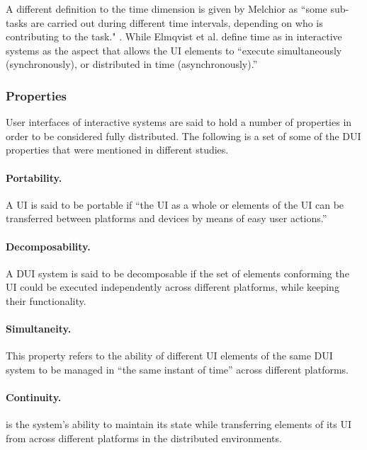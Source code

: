 A different definition to the time dimension is given by Melchior as ``some
sub-tasks are carried out during different time intervals, depending on who is contributing to the task." \cite{melchior2011distributed}. While Elmqvist et al.
\cite{elmqvist2011distributed} define time as in interactive systems as the
aspect that allows the UI elements to ``execute simultaneously
(synchronously), or distributed in time (asynchronously).''\\

\subsubsection{Properties}
User interfaces of interactive systems are said to hold a number of properties
in order to be considered fully distributed. The following is a set of
some of the DUI properties that were mentioned in different studies.

\paragraph{Portability.}  A UI is said to be portable if ``the UI as a whole or elements of the UI can be transferred between platforms and
devices by means of easy user actions.'' \cite{lopez2011formal}\\

\paragraph{Decomposability.} A DUI system is said to be decomposable if the set
of elements conforming the UI could be executed independently across different
platforms, while keeping their functionality.\cite{lopez2011formal}\\

\paragraph{Simultaneity.} This property refers to
the ability of different UI elements of the same DUI system to be managed in
``the same instant of time'' across different platforms.
\cite{lopez2011formal}\\

\paragraph{Continuity.} is the system's ability to maintain
its state while transferring elements of its UI from across different platforms
in the distributed environments.\cite{lopez2011formal}\\

